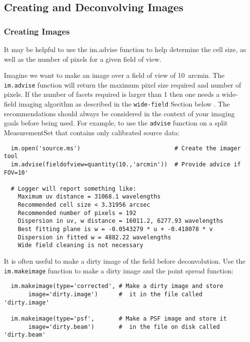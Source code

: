 \subsection{Creating and Deconvolving Images}
\label{subsection:synth.mking.images}

\subsubsection{Creating Images}
\label{subsubsection:synth.create.images}

It may be helpful to use the im.advise function to help determine the
cell size, as well as the number of pixels for a given field of view.

Imagine we want to make an image over a field of view of 10~arcmin.
The {\tt im.advise} function will return the maximum pixel size
required and number of pixels. If the number of facets required is
larger than 1 then one needs a wide-field imaging algorithm as
described in the {\tt wide-field} Section below . The recommendations
should always be considered in the context of your imaging goals
before being used.  For example, to use the {\tt advise} function on a
split MeasurementSet that contains only calibrated source data:

\small
\begin{verbatim}
  im.open('source.ms')                           # Create the imager tool
  im.advise(fieldofview=quantity(10.,'arcmin'))  # Provide advice if FOV=10'

  # Logger will report something like:
    Maximum uv distance = 31068.1 wavelengths
    Recommended cell size < 3.31956 arcsec
    Recommended number of pixels = 192
    Dispersion in uv, w distance = 16011.2, 6277.93 wavelengths
    Best fitting plane is w = -0.0543279 * u + -0.418078 * v
    Dispersion in fitted w = 4882.22 wavelengths
    Wide field cleaning is not necessary
\end{verbatim}
\normalsize

It is often useful to make a dirty image of the field before
deconvolution. Use the {\tt im.makeimage} function to make a dirty
image and the point spread function:


\small
\begin{verbatim}
  im.makeimage(type='corrected', # Make a dirty image and store
       image='dirty.image')      #  it in the file called 'dirty.image'

  im.makeimage(type='psf',       # Make a PSF image and store it
       image='dirty.beam')       #  in the file on disk called 'dirty.beam'
\end{verbatim}
\normalsize
 
